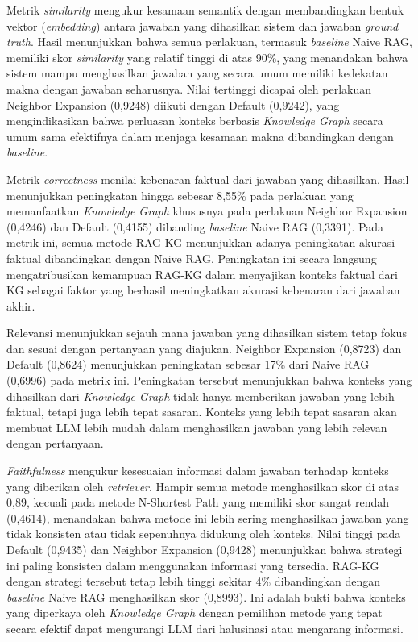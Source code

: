 Metrik \textit{similarity} mengukur kesamaan semantik dengan membandingkan bentuk vektor (\textit{embedding}) antara jawaban yang dihasilkan sistem dan jawaban \textit{ground truth}.
Hasil menunjukkan bahwa semua perlakuan, termasuk \textit{baseline} Naive RAG, memiliki skor \textit{similarity} yang relatif tinggi di atas 90\%, yang menandakan bahwa sistem mampu menghasilkan jawaban yang secara umum memiliki kedekatan makna dengan jawaban seharusnya.
Nilai tertinggi dicapai oleh perlakuan Neighbor Expansion (0,9248) diikuti dengan Default (0,9242), yang mengindikasikan bahwa perluasan konteks berbasis \textit{Knowledge Graph} secara umum sama efektifnya dalam menjaga kesamaan makna dibandingkan dengan \textit{baseline}.

Metrik \textit{correctness} menilai kebenaran faktual dari jawaban yang dihasilkan.
Hasil menunjukkan peningkatan hingga sebesar 8,55\% pada perlakuan yang memanfaatkan \textit{Knowledge Graph} khususnya pada perlakuan Neighbor Expansion (0,4246) dan  Default (0,4155) dibanding \textit{baseline} Naive RAG (0,3391).
Pada metrik ini, semua metode RAG-KG menunjukkan adanya peningkatan akurasi faktual dibandingkan dengan Naive RAG.
Peningkatan ini secara langsung mengatribusikan kemampuan RAG-KG dalam menyajikan konteks faktual dari KG sebagai faktor yang berhasil meningkatkan akurasi kebenaran dari jawaban akhir.

Relevansi menunjukkan sejauh mana jawaban yang dihasilkan sistem tetap fokus dan sesuai dengan pertanyaan yang diajukan.
Neighbor Expansion (0,8723) dan Default (0,8624) menunjukkan peningkatan sebesar 17\% dari Naive RAG (0,6996) pada metrik ini.
Peningkatan tersebut menunjukkan bahwa konteks yang dihasilkan dari \textit{Knowledge Graph} tidak hanya memberikan jawaban yang lebih faktual, tetapi juga lebih tepat sasaran.
Konteks yang lebih tepat sasaran akan membuat LLM lebih mudah dalam menghasilkan jawaban yang lebih relevan dengan pertanyaan.

\textit{Faithfulness} mengukur kesesuaian informasi dalam jawaban terhadap konteks yang diberikan oleh \textit{retriever}.
Hampir semua metode menghasilkan skor di atas 0,89, kecuali pada metode N-Shortest Path yang memiliki skor sangat rendah (0,4614), menandakan bahwa metode ini lebih sering menghasilkan jawaban yang tidak konsisten atau tidak sepenuhnya didukung oleh konteks.
Nilai tinggi pada Default (0,9435) dan Neighbor Expansion (0,9428) menunjukkan bahwa strategi ini paling konsisten dalam menggunakan informasi yang tersedia.
RAG-KG dengan strategi tersebut tetap lebih tinggi sekitar 4\% dibandingkan dengan \textit{baseline} Naive RAG menghasilkan skor (0,8993).
Ini adalah bukti bahwa konteks yang diperkaya oleh \textit{Knowledge Graph} dengan pemilihan metode yang tepat secara efektif dapat mengurangi LLM dari halusinasi atau mengarang informasi.

